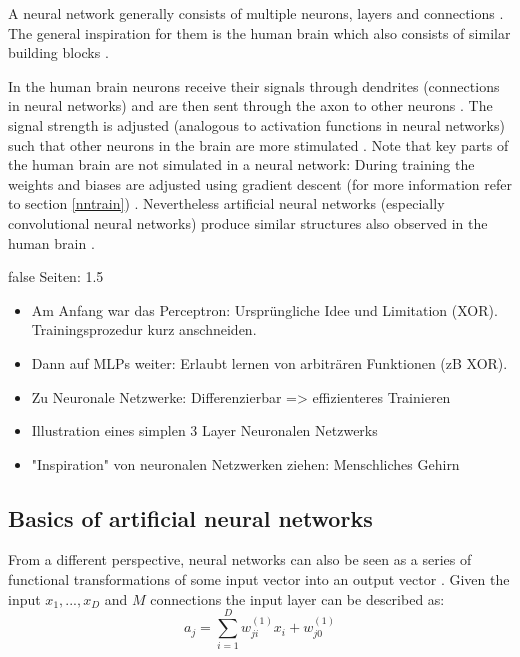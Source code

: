 \documentclass[draft,final,oneside]{vutinfth} %
\begin{document}
A neural network generally consists of multiple neurons, layers and connections \cite{aimodern}. The general inspiration for them is the human brain which also consists of similar building blocks \cite{anintroductiontoneuralnetworks}.

In the human brain neurons receive their signals through dendrites (connections in neural networks) and are then sent through the axon to other neurons \cite{anintroductiontoneuralnetworks}. The signal strength is adjusted (analogous to activation functions in neural networks) such that other neurons in the brain are more stimulated \cite{anintroductiontoneuralnetworks}. Note that key parts of the human brain are not simulated in a neural network: During training the weights and biases are adjusted using gradient descent (for more information refer to section \ref{nntrain}) \cite{recentexcitementabotuneuralnetworks}. Nevertheless artificial neural networks (especially convolutional neural networks) produce similar structures also observed in the human brain \cite{Cichy2016}.


\if false
Seiten: 1.5

\begin{itemize}

\item Am Anfang war das Perceptron: Ursprüngliche Idee und Limitation (XOR). Trainingsprozedur kurz anschneiden.
\item Dann auf MLPs weiter: Erlaubt lernen von arbiträren Funktionen (zB XOR).
\item Zu Neuronale Netzwerke: Differenzierbar => effizienteres Trainieren
\item Illustration eines simplen 3 Layer Neuronalen Netzwerks
\item "Inspiration" von neuronalen Netzwerken ziehen: Menschliches Gehirn

\end{itemize}

\fi

\subsection{Basics of artificial neural networks}

From a different perspective, neural networks can also be seen as a series of functional transformations of some input vector into an output vector \cite{colahbackprop}. Given the input $x_1, ..., x_D$ and $M$ connections the input layer can be described as:
\begin{equation}
a_j = \sum_{i=1}^{D} w_{ji}^{(1)}x_i + w_{j0}^{(1)}
\end{equation}
\end{document}
